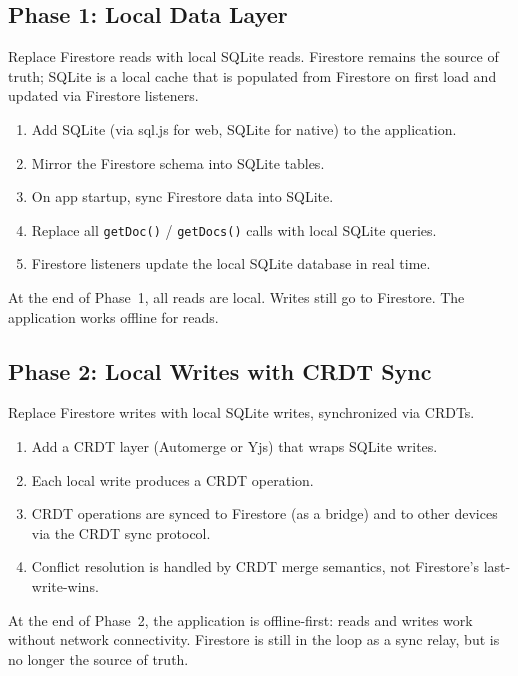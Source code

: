 \documentclass[11pt,a4paper]{article}
\begin{document}
\subsection{Phase 1: Local Data Layer}

Replace Firestore reads with local SQLite reads. Firestore remains the
source of truth; SQLite is a local cache that is populated from Firestore
on first load and updated via Firestore listeners.

\begin{enumerate}
    \item Add SQLite (via sql.js for web, SQLite for native) to the application.
    \item Mirror the Firestore schema into SQLite tables.
    \item On app startup, sync Firestore data into SQLite.
    \item Replace all \texttt{getDoc()} / \texttt{getDocs()} calls with local
    SQLite queries.
    \item Firestore listeners update the local SQLite database in real time.
\end{enumerate}

At the end of Phase~1, all reads are local. Writes still go to Firestore.
The application works offline for reads.

\subsection{Phase 2: Local Writes with CRDT Sync}

Replace Firestore writes with local SQLite writes, synchronized via CRDTs.

\begin{enumerate}
    \item Add a CRDT layer (Automerge or Yjs) that wraps SQLite writes.
    \item Each local write produces a CRDT operation.
    \item CRDT operations are synced to Firestore (as a bridge) and to
    other devices via the CRDT sync protocol.
    \item Conflict resolution is handled by CRDT merge semantics, not
    Firestore's last-write-wins.
\end{enumerate}

At the end of Phase~2, the application is offline-first: reads and writes
work without network connectivity. Firestore is still in the loop as a
sync relay, but is no longer the source of truth.
\end{document}
